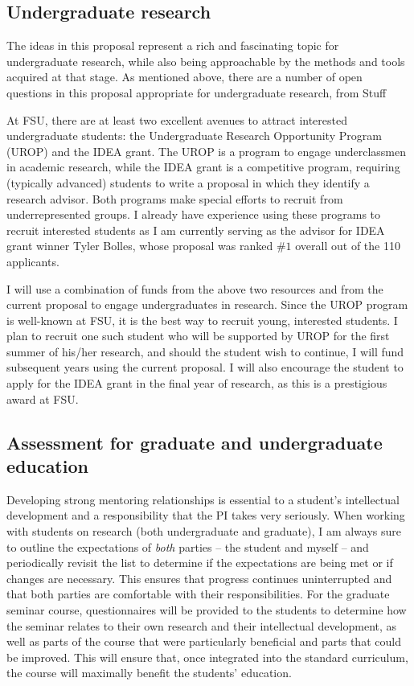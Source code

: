\documentclass[12pt]{article}
\begin{document}
\subsection{Undergraduate research}
The ideas in this proposal represent a rich and fascinating topic for undergraduate research, while also being approachable by the methods and tools acquired at that stage. As mentioned above, there are a number of open questions in this proposal appropriate for undergraduate research, from {\color{blue} Stuff}
	
At FSU, there are at least two excellent avenues to attract interested undergraduate students:  the Undergraduate Research Opportunity Program (UROP) and the IDEA grant. The UROP is a program to engage underclassmen in academic research, while the IDEA grant is a competitive program, requiring (typically advanced) students to write a proposal in which they identify a research advisor. Both programs make special efforts to recruit from underrepresented groups. I already have experience using these programs to recruit interested students as I am currently serving as the advisor for IDEA grant winner Tyler Bolles, whose proposal was ranked $\#1$ overall out of the 110 applicants.

I will use a combination of funds from the above two resources and from the current proposal to engage undergraduates in research. Since the UROP program is well-known at FSU, it is the best way to recruit young, interested students. I plan to recruit one such student who will be supported by UROP for the first summer of his/her research, and should the student wish to continue, I will fund subsequent years using the current proposal. I will also encourage the student to apply for the IDEA grant in the final year of research, as this is a prestigious award at FSU. 


\subsection{Assessment for graduate and undergraduate education}

Developing strong mentoring relationships is essential to a student's intellectual development and a responsibility that the PI takes very seriously. When working with students on research (both undergraduate and graduate), I am always sure to outline the expectations of {\em both} parties -- the student and myself -- and periodically revisit the list to determine if the expectations are being met or if changes are necessary. This ensures that progress continues uninterrupted and that both parties are comfortable with their responsibilities. For the graduate seminar course, questionnaires will be provided to the students to determine how the seminar relates to their own research and their intellectual development, as well as parts of the course that were particularly beneficial and parts that could be improved. This will ensure that, once integrated into the standard curriculum, the course will maximally benefit the students' education.
\end{document}
